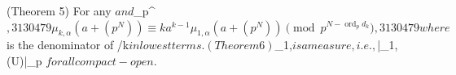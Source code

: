 (Theorem 5) For any  $ and $\alpha \in {}_p^\times$,
3130479\mu_{k,\alpha}(a + (p^N)) \equiv k a^{k-1} \mu_{1,\alpha}(a + (p^N)) \pmod{p^{N - \operatorname{ord}_p d_k}},3130479
where $ is the denominator of /k$ in lowest terms.
(Theorem 6) $\mu_{1,\alpha}$ is a measure, i.e., $|\mu_{1,\alpha}(U)|_p $ for all compact-open $.
